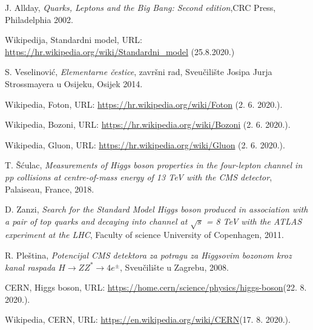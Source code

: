 \documentclass[12pt,a4paper,oneside]{article}
\begin{document}
\begin{linenumbers}
		
		\newpage
		{\raggedright
			\begin{thebibliography}{99}
						
				
				J. Allday, \textit{Quarks, Leptons and the Big Bang: Second edition},CRC Press, Philadelphia 2002.
				
				Wikipedija, Standardni model, URL: \url{https://hr.wikipedia.org/wiki/Standardni_model} (25.8.2020.)
				
				 S. Veselinović, \textit{Elementarne čestice}, završni rad, Sveučilište Josipa Jurja Strossmayera u Osijeku, Osijek 2014.
				 
				 Wikipedia, Foton, URL: \url{https://hr.wikipedia.org/wiki/Foton} (2. 6. 2020.).
				 
				 
				 
				 Wikipedia, Bozoni, URL: \url{https://hr.wikipedia.org/wiki/Bozoni} (2. 6. 2020.).
				 
				 
				 				 Wikipedia, Gluon, URL: \url{https://hr.wikipedia.org/wiki/Gluon} (2. 6. 2020.).
				 
				
				T. Šćulac, \textit{Measurements of Higgs boson properties
					in the four-lepton channel in pp collisions
					at centre-of-mass energy of 13 TeV with
					the CMS detector}, Palaiseau, France, 2018.
				
				D. Zanzi, \textit{Search for the Standard Model Higgs boson produced in
				association with a pair of top quarks and decaying into
				channel at $\sqrt{s}$ = 8 TeV
				with the ATLAS experiment at the LHC}, Faculty of science University of Copenhagen, 2011.
							
				R. Pleština, \textit{Potencijal CMS detektora za
				potragu za Higgsovim bozonom kroz
				kanal raspada \begin{math}
				H \rightarrow ZZ^{*} \rightarrow 4e^{\pm}
				\end{math}}, Sveučilište u Zagrebu, 2008.
				
				CERN, Higgs boson, URL: \url{https://home.cern/science/physics/higgs-boson}(22. 8. 2020.).
				
				
				Wikipedia, CERN, URL: \url{https://en.wikipedia.org/wiki/CERN}(17. 8. 2020.).
				

\end{thebibliography}}
\end{linenumbers}
\end{document}
